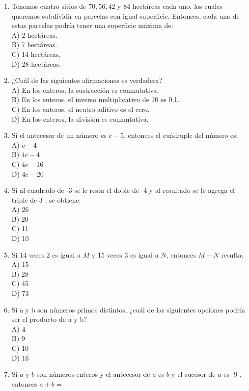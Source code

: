 \documentclass[10pt]{article}
\begin{document}
\begin{enumerate}
B) 9\\
C) 6\\
D) 3
  \item Tenemos cuatro sitios de $70,56,42$ y 84 hectáreas cada uno, los cuales queremos subdividir en parcelas con igual superficie. Entonces, cada una de estas parcelas podría tener una superficie máxima de:\\
A) 2 hectáreas.\\
B) 7 hectáreas.\\
C) 14 hectáreas.\\
D) 28 hectáreas.
  \item ¿Cuál de las siguientes afirmaciones es verdadera?\\
A) En los enteros, la sustracción es conmutativa.\\
B) En los enteros, el inverso multiplicativo de 10 es 0,1.\\
C) En los enteros, el neutro aditivo es el cero.\\
D) En los enteros, la división es conmutativa.
  \item Si el antecesor de un número es $\mathrm{c}-5$, entonces el cuádruple del número es:\\
A) $\mathrm{c}-4$\\
B) $4 c-4$\\
C) $4 c-16$\\
D) $4 c-20$
  \item Si al cuadrado de -3 se le resta el doble de -4 y al resultado se le agrega el triple de 3 , se obtiene:\\
A) 26\\
B) 20\\
C) 11\\
D) 10
  \item Si 14 veces 2 es igual a $M$ y 15 veces 3 es igual a $N$, entonces $M+N$ resulta:\\
A) 15\\
B) 28\\
C) 45\\
D) 73
  \item Si a y b son números primos distintos, ¿cuál de las siguientes opciones podría ser el producto de a y b?\\
A) 4\\
B) 9\\
C) 10\\
D) 16
  \item Si $a$ y $b$ son números enteros y el antecesor de $a$ es $b$ y el sucesor de $a$ es -9 , entonces $a+b=$\\

\end{enumerate}
\end{document}
